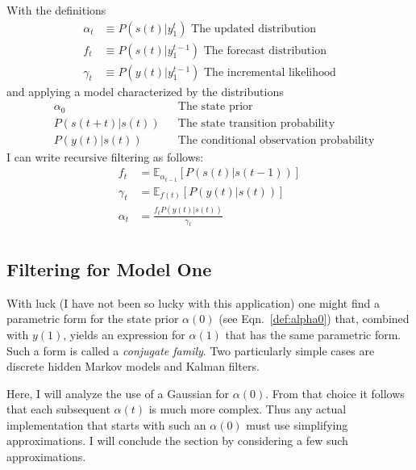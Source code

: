 \documentclass[12pt]{article}
\newcommand{\field}[1]{\mathbb{#1}}
\newcommand{\EV}[2]{\field{E}_{#1}\left[#2\right]}
\newcommand{\ti}[2]{{#1}{(#2)}}                         %
\newcommand{\ts}[4]{{#1}_{#3}^{#4}} %
\begin{document}
With the definitions
\begin{align}
  \label{def:alpha}
  \alpha_t &\equiv P(\ti{s}{t}|\ts{y}{\tau}{1}{t}) \text{ The updated distribution} \\
  f_t &\equiv P(\ti{s}{t}|\ts{y}{\tau}{1}{t-1}) \text{ The forecast
    distribution} \\
  \gamma_t &\equiv P(\ti{y}{t}|\ts{y}{\tau}{1}{t-1}) \text{ The
    incremental likelihood}
\end{align}
and applying a model characterized by the distributions
\begin{align}
  \label{def:alpha0}
  &\alpha_0  &&\text{The state prior} \\
  &P(\ti{s}{t+t}|\ti{s}{t}) &&\text{The state transition probability} \\
  &P(\ti{y}{t}|\ti{s}{t}) &&\text{The conditional observation probability}
\end{align}
I can write recursive filtering as follows:
\begin{align}
  f_t &= \EV{\alpha_{t-1}} {P(\ti{s}{t}|\ti{s}{t-1})} \\
  \gamma_t &= \EV{\ti{f}{t}} {P(\ti{y}{t}|\ti{s}{t})} \\
  \alpha_t &= \frac{f_t P(\ti{y}{t}|\ti{s}{t})}{\gamma_t} \\
\end{align}

\subsection{Filtering for Model One}
\label{sec:filter2}

With luck (I have not been so lucky with this application) one might
find a parametric form for the state prior $\alpha(0)$ (see
Eqn.~\eqref{def:alpha0}) that, combined with $\ti{y}{1}$, yields an
expression for $\alpha(1)$ that has the same parametric form.  Such a
form is called a \emph{conjugate family}.  Two particularly simple
cases are discrete hidden Markov models and Kalman filters.

Here, I will analyze the use of a Gaussian for $\alpha(0)$.  From that
choice it follows that each subsequent $\ti{\alpha}{t}$ is much more
complex.  Thus any actual implementation that starts with such an
$\alpha(0)$ must use simplifying approximations.  I will conclude the
section by considering a few such approximations.
\end{document}

